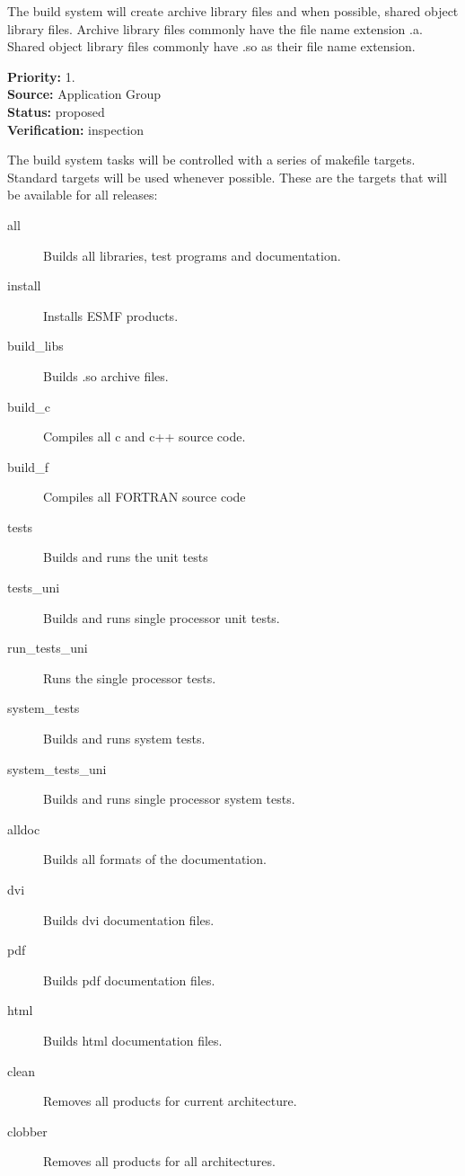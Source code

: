 

The build system will create  archive library files and when
possible, shared object library files. Archive library files commonly
have the file name extension .a.  Shared object library files commonly
have .so as their file name extension.
\begin{reqlist}
{\bf Priority:} 1. \\
{\bf Source:} Application Group \\
{\bf Status:}  proposed \\
{\bf Verification:} inspection
\end{reqlist}

The build system tasks will be controlled with a series of
makefile targets. Standard targets will be used whenever 
possible. These are the targets that will be available
for all releases:

\begin{description}
\item[all] Builds all libraries, test programs and documentation.
\item[install] Installs ESMF products.

\item[build\_libs] Builds .so archive files.
\item[build\_c] Compiles all c and c++ source code.  
\item[build\_f] Compiles all FORTRAN source code 

\item[tests] Builds and runs the unit tests
\item[tests\_uni] Builds and runs single processor unit tests.

\item[run\_tests\_uni] Runs the single processor tests.
\item[system\_tests] Builds and runs system tests.
\item[system\_tests\_uni] Builds and runs single processor system tests.

\item[alldoc] Builds all formats of the documentation.
\item[dvi] Builds dvi documentation files.
\item[pdf] Builds pdf documentation files.
\item[html] Builds html documentation files.
\item[clean] Removes all products for current architecture.
\item[clobber] Removes all products for all architectures.

\end{description}

